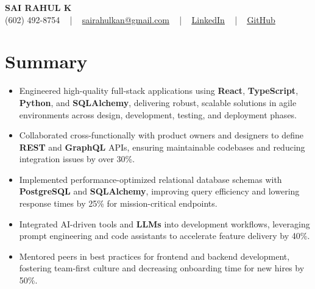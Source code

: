 \documentclass[letterpaper,11pt]{article}
\newcommand{\resumeItem}[1]{
  \item\footnotesize{
    {#1 \vspace{-2pt}}
  }
}
\newcommand{\resumeItemListStart}{\begin{itemize}[leftmargin=*]}
\newcommand{\resumeItemListEnd}{\end{itemize}\vspace{-5pt}}
\begin{document}
\begin{center}
    {\fontsize{14pt}{12pt}\selectfont \textbf{\MakeUppercase{Sai Rahul K}}}\\ \vspace{2pt}
    \fontsize{10pt}{12pt}\selectfont (602) 492-8754 ~ | ~ \href{mailto:sairahulkan@gmail.com}{sairahulkan@gmail.com} ~ | ~
    \href{https://www.linkedin.com/in/rq123/}{\color{blue}\underline{LinkedIn}} ~ | ~
    \href{https://github.com/kanrahuldo}{\color{blue}\underline{GitHub}}~
    \vspace{-8pt}
\end{center}

\section{Summary}
\fontsize{9pt}{10pt}\selectfont
\resumeItemListStart
    \resumeItem{Engineered high-quality full-stack applications using \textbf{React}, \textbf{TypeScript}, \textbf{Python}, and \textbf{SQLAlchemy}, delivering robust, scalable solutions in agile environments across design, development, testing, and deployment phases.}
    \resumeItem{Collaborated cross-functionally with product owners and designers to define \textbf{REST} and \textbf{GraphQL} APIs, ensuring maintainable codebases and reducing integration issues by over 30\%.}
    \resumeItem{Implemented performance-optimized relational database schemas with \textbf{PostgreSQL} and \textbf{SQLAlchemy}, improving query efficiency and lowering response times by 25\% for mission-critical endpoints.}
    \resumeItem{Integrated AI-driven tools and \textbf{LLMs} into development workflows, leveraging prompt engineering and code assistants to accelerate feature delivery by 40\%.}
    \resumeItem{Mentored peers in best practices for frontend and backend development, fostering team-first culture and decreasing onboarding time for new hires by 50\%.}
\resumeItemListEnd
\vspace{-6pt}
\end{document}
